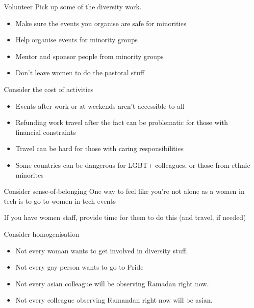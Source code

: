 \documentclass[xcolor=table,aspectratio=169]{beamer}
\begin{document}
\begin{frame}{Volunteer}
        Pick up some of the diversity work. 
	\begin{itemize}
		\item Make sure the events you organise are safe for minorities
		\item Help organise events for minority groups
		\item Mentor and sponsor people from minority groups 
		\item Don't leave women to do the pastoral stuff 
	\end{itemize}
\end{frame}
\begin{frame}{Consider the cost of activities}
	\begin{itemize}
		\item Events after work or at weekends aren't accessible to all
		\item Refunding work travel after the fact can be problematic for those with financial constraints
	\item Travel can be hard for those with caring responsibilities
	\item Some countries can be dangerous for LGBT+ colleagues, or those from ethnic minorites
	\end{itemize}
\end{frame}
\begin{frame}{Consider sense-of-belonging}
One way to feel like you're not alone as a women in tech is to go to women in tech events 

	\vspace{0.5em}

	If you have women staff, provide time for them to do this (and travel, if needed)
\end{frame}

\begin{frame}{Consider homogenisation}
	\begin{itemize}
		\item Not every woman wants to get involved in diversity stuff.
		\item Not every gay person wants to go to Pride
		\item Not every asian colleague will be observing Ramadan right now. 
		\item Not every colleague observing Ramandan right now will be asian.  
	\end{itemize}
\end{frame}
\end{document}
